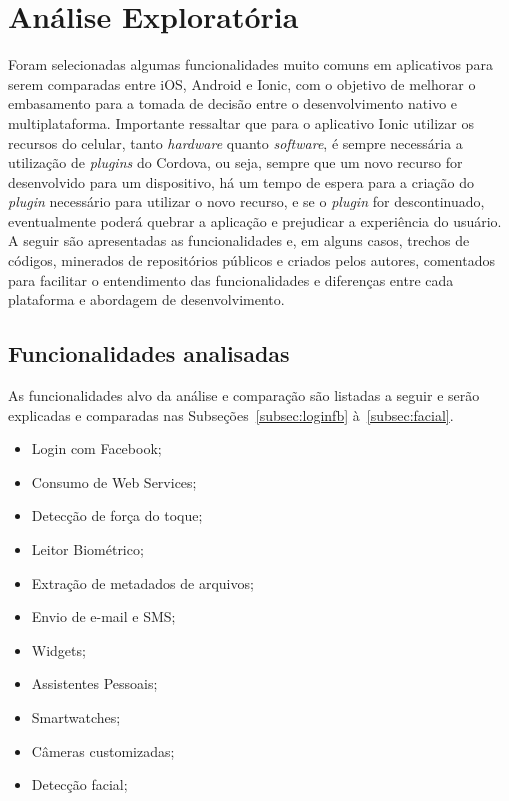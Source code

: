 \chapter{Análise Exploratória} \label{cap:analise_exploratoria}


Foram selecionadas algumas funcionalidades muito comuns em aplicativos para serem comparadas entre iOS, Android e Ionic, com o objetivo de melhorar o embasamento para a tomada de decisão entre o desenvolvimento 
nativo e multiplataforma. Importante ressaltar que para o aplicativo Ionic utilizar os recursos do celular, tanto \textit{hardware} quanto \textit{software}, é sempre necessária a utilização de 
\textit{plugins} do Cordova, ou seja, sempre que um novo recurso for desenvolvido para um dispositivo, há um tempo de espera para a criação do \textit{plugin} necessário para utilizar o novo recurso, 
e se o \textit{plugin} for descontinuado, eventualmente poderá quebrar a aplicação e prejudicar a experiência do usuário. A seguir são apresentadas as funcionalidades e, em alguns casos, trechos de códigos, minerados 
de repositórios públicos e criados pelos autores, comentados para facilitar o entendimento das funcionalidades e diferenças entre cada plataforma e abordagem de desenvolvimento. 

\section{Funcionalidades analisadas}\label{sec:intro_analise_exp}

As funcionalidades alvo da análise e comparação são listadas a seguir e serão explicadas e comparadas nas Subseções~\ref{subsec:loginfb} à~\ref{subsec:facial}. 

\begin{itemize}
	\item Login com Facebook;
	\item Consumo de Web Services;
	\item Detecção de força do toque;
	\item Leitor Biométrico;
	\item Extração de metadados de arquivos;
	\item Envio de e-mail e SMS;
	\item Widgets;
	\item Assistentes Pessoais;
	\item Smartwatches;
	\item Câmeras customizadas;
	\item Detecção facial;
\end{itemize}


